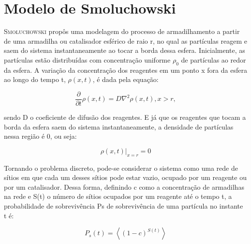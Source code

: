 
\section{Modelo de Smoluchowski}

\lettrine{S}{moluchowski} propôs uma modelagem do processo de armadilhamento a partir de uma
armadilha ou catalisador esférico de raio r, no qual as partículas reagem e saem
do sistema instantaneamente ao tocar a borda dessa esfera. Inicialmente, as
partículas estão distribuídas com concentração uniforme $\rho_0$ de partículas
ao redor da esfera\cite{3}. A variação da concentração dos reagentes em um
ponto x fora da esfera ao longo do tempo t, $\rho(x,t)$, é dada pela
equação\cite{3}:

{
\setlength{\belowdisplayskip}{0pt} \setlength{\belowdisplayshortskip}{0pt}
\setlength{\abovedisplayskip}{0pt} \setlength{\abovedisplayshortskip}{0pt}

\begin{equation}
  \frac{\partial}{\partial t}\rho(x,t) = D\nabla^2\rho(x,t), x>r,
  \label{Equation-021}
\end{equation}
}

\noindent sendo D o coeficiente de difusão dos reagentes. E já que os reagentes
que tocam a borda da esfera saem do sistema instantaneamente, a densidade de
partículas nessa região é 0, ou seja\cite{3}:

{
\setlength{\belowdisplayskip}{0pt} \setlength{\belowdisplayshortskip}{0pt}
\setlength{\abovedisplayskip}{0pt} \setlength{\abovedisplayshortskip}{0pt}

\begin{equation}
  \rho(x,t)|_{x=r} = 0
  \label{Equation-022}
\end{equation}
}

Tornando o problema discreto, pode-se considerar o sistema como uma rede de
sítios em que cada um desses sítios pode estar vazio, ocupado por um reagente
ou por um catalisador\cite{3}.  Dessa forma, definindo c como a concentração de
armadilhas na rede e S(t) o número de sítios ocupados por um reagente até o
tempo t, a probabilidade de sobrevivência Ps de sobrevivência de uma partícula
no instante t é\cite{6}:

{
\setlength{\belowdisplayskip}{0pt} \setlength{\belowdisplayshortskip}{0pt}
\setlength{\abovedisplayskip}{0pt} \setlength{\abovedisplayshortskip}{0pt}

\begin{equation}
  P_s(t) = \left<(1-c)^{S(t)}\right>
  \label{Equation-023-Probabilidade}
\end{equation}
}

